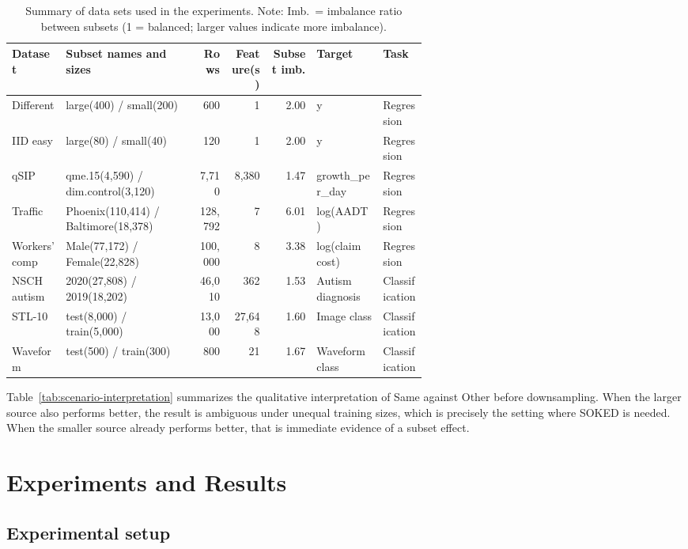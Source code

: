 \documentclass{article}
\begin{document}
\begin{table}[t]
\centering
\scriptsize
\setlength{\tabcolsep}{2pt}
\caption{Summary of data sets used in the experiments. Note: Imb.\ = imbalance ratio between subsets (1 = balanced; larger values indicate more imbalance).}
\label{tab:dataset-summary}
\begin{tabular}{p{0.13\linewidth}p{0.32\linewidth}rrrp{0.16\linewidth}l}
\toprule
\textbf{Dataset} & \textbf{Subset names and sizes} & \textbf{Rows} & \textbf{Feature(s)} & \textbf{Subset imb.} & \textbf{Target} & \textbf{Task} \\
\midrule
Different & large(400) / small(200) & 600 & 1 & 2.00 & y & Regression \\
IID easy & large(80) / small(40) & 120 & 1 & 2.00 & y & Regression \\
\midrule
qSIP &  qme.15(4,590) / dim.control(3,120) & 7,710 & 8,380 & 1.47 & growth\_per\_day & Regression \\
Traffic & Phoenix(110,414) / Baltimore(18,378) & 128,792 & 7 & 6.01 & log(AADT) & Regression \\
Workers' comp & Male(77,172) / Female(22,828) & 100,000 & 8 & 3.38 & log(claim cost) & Regression \\
\midrule
NSCH autism & 2020(27,808) / 2019(18,202) & 46,010 & 362 & 1.53 & Autism diagnosis & Classification \\
STL-10 & test(8,000) / train(5,000) & 13,000 & 27,648 & 1.60 & Image class & Classification \\
Waveform & test(500) / train(300) & 800 & 21 & 1.67 & Waveform class & Classification \\
\bottomrule
\end{tabular}
\end{table}

Table~\ref{tab:scenario-interpretation} summarizes the qualitative interpretation of Same against Other before downsampling.
When the larger source also performs better, the result is ambiguous under unequal training sizes, which is precisely the setting where SOKED is needed.
When the smaller source already performs better, that is immediate evidence of a subset effect.
\section{Experiments and Results}
\label{sec:experiments-results}
\subsection{Experimental setup}
\label{sec:datasets}
\end{document}
